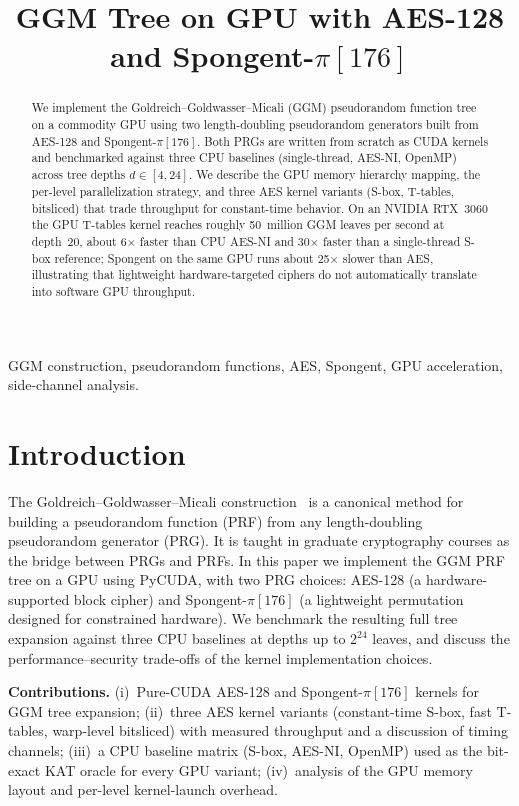 \documentclass[10pt,conference]{IEEEtran}
\title{GGM Tree on GPU with AES-128 and Spongent-$\pi[176]$}
\author{
\IEEEauthorblockN{Member 1, Member 2, Member 3}
\IEEEauthorblockA{Department of Electrical and Computer Engineering\\
University of California San Diego\\
La Jolla, CA, USA}
}
\begin{document}
\maketitle

\begin{abstract}
We implement the Goldreich--Goldwasser--Micali (GGM) pseudorandom function tree on
a commodity GPU using two length-doubling pseudorandom generators built from
AES-128 and Spongent-$\pi[176]$. Both PRGs are written from scratch as CUDA
kernels and benchmarked against three CPU baselines (single-thread,
AES-NI, OpenMP) across tree depths $d \in [4, 24]$. We describe the GPU memory
hierarchy mapping, the per-level parallelization strategy, and three AES kernel
variants (S-box, T-tables, bitsliced) that trade throughput for constant-time
behavior. On an NVIDIA RTX~3060 the GPU
T-tables kernel reaches roughly 50~million GGM leaves per second at
depth~20, about 6$\times$ faster than CPU AES-NI and 30$\times$ faster
than a single-thread S-box reference; Spongent on the same GPU runs
about 25$\times$ slower than AES, illustrating that lightweight
hardware-targeted ciphers do not automatically translate into software
GPU throughput.
\end{abstract}

\begin{IEEEkeywords}
GGM construction, pseudorandom functions, AES, Spongent, GPU acceleration, side-channel analysis.
\end{IEEEkeywords}

\section{Introduction}
The Goldreich--Goldwasser--Micali construction~\cite{ggm1986} is a canonical
method for building a pseudorandom function (PRF) from any length-doubling
pseudorandom generator (PRG). It is taught in graduate cryptography courses as
the bridge between PRGs and PRFs. In this paper we implement the GGM PRF tree
on a GPU using PyCUDA, with two PRG choices: AES-128 (a hardware-supported
block cipher) and Spongent-$\pi[176]$ (a lightweight permutation designed for
constrained hardware). We benchmark the resulting full tree expansion against
three CPU baselines at depths up to $2^{24}$ leaves, and discuss the
performance--security trade-offs of the kernel implementation choices.

\textbf{Contributions.}
(i)~Pure-CUDA AES-128 and Spongent-$\pi[176]$ kernels for GGM tree expansion;
(ii)~three AES kernel variants (constant-time S-box, fast T-tables, warp-level
bitsliced) with measured throughput and a discussion of timing channels;
(iii)~a CPU baseline matrix (S-box, AES-NI, OpenMP) used as the bit-exact KAT
oracle for every GPU variant; (iv)~analysis of the GPU memory layout and
per-level kernel-launch overhead.
\end{document}
